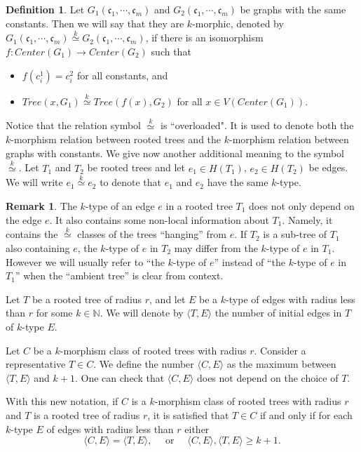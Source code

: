 \documentclass[11pt,notitlepage,a4paper]{article}
\theoremstyle{definition}
\newtheorem{definition}{Definition}[section]
\newtheorem{remark}{Remark}[section]
\newcommand{\N}{\mathbb{N}}
\newcommand{\clist}{\mathfrak{c}_{1}, \cdots, \mathfrak{c}_m}
\newcommand{\morph}[1]{\stackrel{#1}{\simeq}}
\begin{document}
\begin{definition} 
	Let $G_1(\clist)$ and $G_2(\clist)$ be graphs with the same constants. 
	Then we
	will say that they are $k$-morphic, denoted by $G_1(\clist)\morph{k}G_2(\clist)$, if there is an isomorphism
	$f:Center(G_1)\rightarrow Center(G_2)$ such that
	\begin{itemize}
		\item $f(c^1_i)=c^2_i$ for all constants, and
		\item $Tree(x,G_1)\morph{k} Tree(f(x),G_2)$ for all $x\in V(Center(G_1))$.
	\end{itemize}
\end{definition}


Notice that the relation symbol $\morph{k}$ is ``overloaded". 
It is used to denote
both the $k$-morphism relation between rooted 
trees and the $k$-morphism relation
between graphs with constants. We give now another additional
meaning to the symbol $\morph{k}$. 
Let $T_1$ and $T_2$ be rooted trees
and let $e_1\in H(T_1)$, $e_2\in H(T_2)$ be edges. We will 
write $e_1\morph{k} e_2$ to denote that $e_1$ and $e_2$ have
the same $k$-type.


\begin{remark}
	The $k$-type of an edge $e$ in a rooted tree $T_1$
	does not only depend on the edge $e$. It also contains some 
	non-local information about $T_1$. Namely, it contains the 
	$\morph{k}$ classes of the trees ``hanging'' from $e$.
	If $T_2$ is a sub-tree of $T_1$ also containing $e$, the $k$-type
	of $e$ in $T_2$ may differ from the $k$-type of $e$ in $T_1$.
	However we will usually refer to ``the $k$-type of $e$'' instead of
	``the $k$-type of $e$ in $T_1$'' when the ``ambient tree'' is clear
	from context.   
\end{remark}

Let $T$ be a rooted tree of radius $r$, and let $E$ be a $k$-type of edges with radius less than $r$ for some $k\in \N$. We will denote by $\langle T,E \rangle$
the number of initial edges in $T$ of $k$-type $E$. \par
Let $C$ be a $k$-morphism class of rooted trees with radius $r$. 
Consider
a representative $T\in C$. We define the number $\langle C, E \rangle$ 
as the maximum between $\langle T, E\rangle$ and $k+1$. One can check that 
$\langle C, E\rangle$ does not depend on the choice of $T$.\par

With this new notation, if $C$ is a $k$-morphism class of rooted
trees with radius $r$ and $T$ is a rooted tree of radius $r$, it
is satisfied that $T\in C$ if and only if for each $k$-type $E$ of edges 
with radius less than $r$ either
\[ \langle C,E \rangle=\langle T,E \rangle, \quad \text{ or } \quad
\langle C,E \rangle,
\langle T,E \rangle \geq k+1 .\]
 
\end{document}
